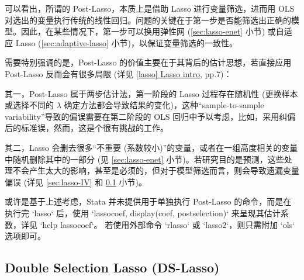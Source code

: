 可以看出，所谓的 Post-Lasso，本质上是借助 Lasso 进行变量筛选，进而用 OLS 对选出的变量执行传统的线性回归。问题的关键在于第一步是否能筛选出正确的模型。因此，在某些情况下，第一步可以换用弹性网 (\ref{sec:lasso-enet} 小节) 或自适应 Lasso (\ref{sec:adaptive-lasso} 小节)，以保证变量筛选的一致性。

需要特别强调的是，Post-Lasso 的价值主要在于其背后的估计思想，若直接应用 Post-Lasso 反而会有很多局限 (详见 \href{https://www.stata.com/manuals/lassoLasso intro.pdf}{[lasso] Lasso intro}, pp.7)：

其一，Post-Lasso 属于两步估计法，第一阶段的 Lasso 过程存在随机性 (更换样本或选择不同的 $\lambda$ 确定方法都会导致结果的变化)，这种“sample-to-sample
variability”导致的偏误需要在第二阶段的 OLS 回归中予以考虑，比如，采用纠偏后的标准误，然而，这是个很有挑战的工作。

其二，Lasso 会删去很多“不重要 (系数较小)”的变量，或者在一组高度相关的变量中随机删除其中的一部分 (见 \ref{sec:lasso-enet} 小节)。若研究目的是预测，这些处理不会产生太大的影响，甚至是必须的，但对于模型筛选而言，则会导致遗漏变量偏误 (详见 \ref{sec:lasso-IV} 和 \ref{sec:lasso-DSL} 小节)。

或许是基于上述考虑，Stata 并未提供用于单独执行 Post-Lasso 的命令，而是在执行完 `lasso` 后，使用 `lassocoef, display(coef, postselection)` 来呈现其估计系数，详见 `help lassocoef`。
若使用外部命令 `rlasso` 或 `lasso2`，则只需附加 `ols` 选项即可。 





\subsection{Double Selection Lasso (DS-Lasso)}\label{sec:lasso-DSL}


